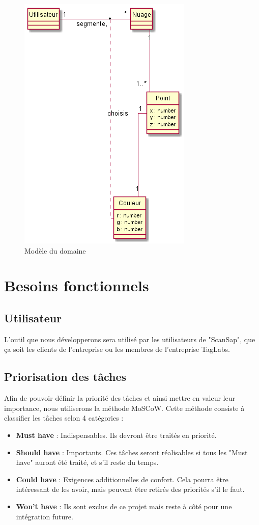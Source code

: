 \documentclass[12pt,titlepage,french]{article}
\begin{document}
\begin{figure}
    \centering

    \includegraphics[scale=0.75]{modele_domaine.png}
    \caption{Modèle du domaine}
\end{figure}


\section{Besoins fonctionnels}

\subsection*{Utilisateur}
L'outil que nous développerons sera utilisé par les utilisateurs de "ScanSap", que ça soit les clients de l'entreprise ou les membres de l'entreprise TagLabs.

\subsection*{Priorisation des tâches}

Afin de pouvoir définir la priorité des tâches et ainsi mettre en valeur leur importance, nous utiliserons la méthode MoSCoW. Cette méthode consiste à classifier les tâches selon 4 catégories :

\begin{itemize}
    \item \textbf{Must have} : Indispensables. Ils devront être traités en priorité.
    \item \textbf{Should have} : Importants. Ces tâches seront réalisables si tous les "Must have" auront été traité, et s'il reste du temps.
    \item \textbf{Could have} : Exigences additionnelles de confort. Cela pourra être intéressant de les avoir, mais peuvent être retirés des priorités s'il le faut.
    \item \textbf{Won't have} : Ils sont exclus de ce projet mais reste à côté pour une intégration future.
\end{itemize}
\end{document}
